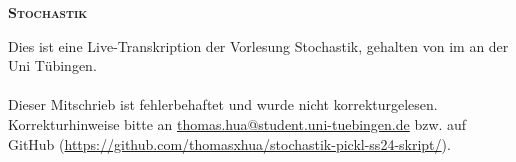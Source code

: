 

\usepackage{hyperref}
\usepackage{url}
\usepackage{tikz}
\usepackage{titlesec}
\newcommand{\pickl}[1]{\begin{center}\hrulefill\ \texttt{[ \textbf{Pickl #1} ]}\ \hrulefill\end{center}}
\newcommand{\PP}{\mathbb{P}}
\renewcommand{\thesection}{\Roman{section}}
\setcounter{tocdepth}{2}
\renewcommand{\contentsname}{Inhaltsverzeichnis}


\begin{center}
    {\huge{\textsc{\textbf{Stochastik}}}}
\end{center}
Dies ist eine Live-Transkription der Vorlesung Stochastik, gehalten von  im  an der Uni T\"ubingen.
\\~\\
Dieser Mitschrieb ist fehlerbehaftet und wurde nicht korrekturgelesen. Korrekturhinweise bitte an \href{mailto:thomas.hua@student.uni-tuebingen.de}{\url{thomas.hua@student.uni-tuebingen.de}} bzw. auf GitHub (\href{https://github.com/thomasxhua/stochastik-pickl-ss24-skript/}{\url{https://github.com/thomasxhua/stochastik-pickl-ss24-skript/}}).
\tableofcontents
\newpage











